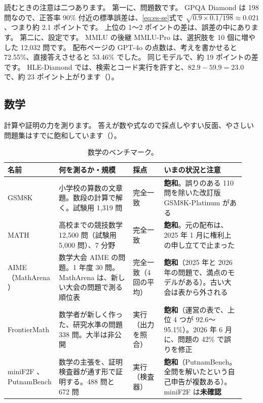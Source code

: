 読むときの注意は二つあります。
第一に、問題数です。
GPQA Diamond は 198 問なので、正答率 90\% 付近の標準誤差は、\eqref{eq:es-se}式で $\sqrt{0.9\times0.1/198}\approx0.021$、つまり約 2.1 ポイントです。
上位の 1〜2 ポイントの差は、誤差の中にあります。
第二に、設定です。
MMLU の後継 MMLU-Pro \cite{wang2024mmlupro} は、選択肢を 10 個に増やした 12,032 問です。
配布ページの GPT-4o の点数は、考えを書かせると 72.55\%、直接答えさせると 53.46\% でした。
同じモデルで、約 19 ポイントの差です。
HLE-Diamond では、検索とコード実行を許すと、$82.9-59.9=23.0$ で、約 23 ポイント上がります（）。

\subsection{数学}\label{sec:bm-math}

計算や証明の力を測ります。
答えが数や式なので採点しやすい反面、やさしい問題集はすでに飽和しています（）。

\begin{table}[htbp]
\centering\small\setlength{\tabcolsep}{4pt}
\caption{数学のベンチマーク。}
\label{tab:bm-math}
\begin{tabular}{@{}>{\raggedright\arraybackslash}p{0.15\linewidth}>{\raggedright\arraybackslash}p{0.31\linewidth}>{\raggedright\arraybackslash}p{0.13\linewidth}>{\raggedright\arraybackslash}p{0.34\linewidth}@{}}
\toprule
名前 & 何を測るか・規模 & 採点 & いまの状況と注意 \\
\midrule
GSM8K \cite{cobbe2021gsm8k} & 小学校の算数の文章題。数段の計算で解く。試験用 1,319 問 & 完全一致 & \textbf{飽和}。誤りのある 110 問を除いた改訂版 GSM8K-Platinum がある \\
\addlinespace[0.2em]
MATH \cite{hendrycks2021math} & 高校までの競技数学 12,500 問（試験用 5,000 問）、7 分野 & 完全一致 & \textbf{飽和}。元の配布は、2025 年 1 月に権利上の申し立てで止まった \\
\addlinespace[0.2em]
AIME（MathArena \cite{balunovic2025matharena}） & 数学大会 AIME の問題。1 年度 30 問。MathArena は、新しい大会の問題で測る順位表 & 完全一致（4 回の平均） & \textbf{飽和}（2025 年と 2026 年の問題で、満点のモデルがある）。古い大会は表から外される \\
\addlinespace[0.2em]
FrontierMath \cite{glazer2024frontiermath} & 数学者が新しく作った、研究水準の問題 338 問。大半は非公開 & 実行（出力を照合） & \textbf{飽和}（運営の表で、上位 4 つが 92.6〜95.1\%）。2026 年 6 月に、問題の 42\% で誤りを修正 \\
\addlinespace[0.2em]
miniF2F \cite{zheng2021minif2f}、\mbox{PutnamBench} & 数学の主張を、証明検査器が通す形で証明する。488 問と 672 問 & 実行（検査器） & \textbf{飽和}（PutnamBench。全問を解いたという自己申告が複数ある）。miniF2F は\textbf{未確認} \\
\bottomrule
\end{tabular}
\end{table}

